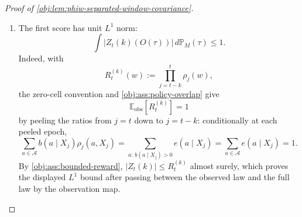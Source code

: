 \documentclass[11pt]{article}
\begin{document}
\begin{proof}[Proof of \cref{obj:lem:phiw-separated-window-covariance}]
\begin{enumerate}
Also, by definition of \(\mathbb P_M^{\mathrm{obs}}\),
\[
\int Z_t(k)(w)\,d\mathbb P_M^{\mathrm{obs}}(w)
=
\int Z_t(k)(O(\tau))\,d\mathbb P_M(\tau).
\]
Thus the covariance equals the centered full-law product
\[
\operatorname{Cov}_{\mathrm{obs}}(Z_t(k),Z_u(k))
=
\int Z_t(k)(O(\tau))\,\Phi_{\gamma,k}(S_{t+1}(\tau))\,d\mathbb P_M(\tau)
-
\Bigl(\int Z_t(k)(O(\tau))\,d\mathbb P_M(\tau)\Bigr)
\Bigl(\int \Phi_{\gamma,k}(S_{t+1}(\tau))\,d\mathbb P_M(\tau)\Bigr).
\]
The covariance identity is legitimate because
\[
Z_t(k),Z_u(k)\in L^2(\mathbb P_M^{\mathrm{obs}}).
\]
Indeed, write the window product in \(Z_m(k)\) as
\[
R_m^{(k)}(w):=\prod_{\substack{j\in\{0,\ldots,T-1\}:\, j\le m,\ m-j\le k}}
\rho_j(w),
\qquad m\in\{t,u\}.
\]
The product contains at most \(k+1\) factors. The zero-cell convention and \cref{obj:ass:policy-overlap} make each factor nonnegative and at most \(L\) on observed behavior-support cells, while \cref{obj:ass:bounded-reward} gives \(|Y_m|\le 1\) almost surely. Hence \(|Z_m(k)|\le L^{k+1}\) almost surely under \(\mathbb P_M^{\mathrm{obs}}\), and the two scores are square-integrable. %

\item The first score has unit \(L^1\) norm:
\[
\int |Z_t(k)(O(\tau))|\,d\mathbb P_M(\tau)\le 1 .
\]
Indeed, with
\[
R_t^{(k)}(w):=\prod_{j=t-k}^{t}\rho_j(w),
\]
the zero-cell convention and \cref{obj:ass:policy-overlap} give
\[
\mathbb E_{\mathrm{obs}}\!\left[R_t^{(k)}\right]=1
\]
by peeling the ratios from \(j=t\) down to \(j=t-k\): conditionally at each peeled epoch,
\[
\sum_{a\in\mathcal A} b(a\mid X_j)\rho_j(a,X_j)
=
\sum_{a:\,b(a\mid X_j)>0} e(a\mid X_j)
=
\sum_{a\in\mathcal A} e(a\mid X_j)
=1 .
\]
By \cref{obj:ass:bounded-reward}, \(|Z_t(k)|\le R_t^{(k)}\) almost surely, which proves the displayed \(L^1\) bound after passing between the observed law and the full law by the observation map. %


\end{enumerate}
\end{proof}
\end{document}
